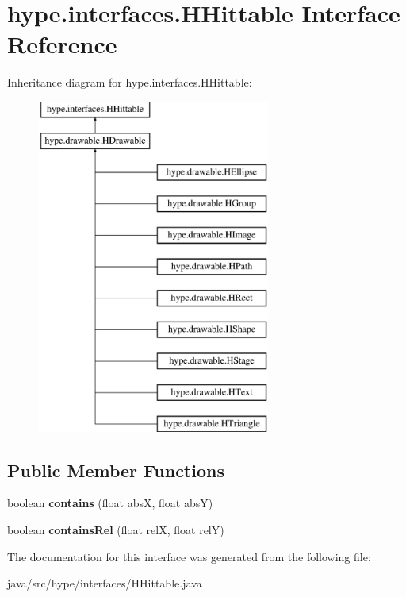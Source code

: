 \hypertarget{interfacehype_1_1interfaces_1_1_h_hittable}{\section{hype.\-interfaces.\-H\-Hittable Interface Reference}
\label{interfacehype_1_1interfaces_1_1_h_hittable}
}
Inheritance diagram for hype.\-interfaces.\-H\-Hittable\-:\begin{figure}[H]
\begin{center}
\leavevmode
\includegraphics[height=11.000000cm]{interfacehype_1_1interfaces_1_1_h_hittable}
\end{center}
\end{figure}
\subsection*{Public Member Functions}
\begin{DoxyCompactItemize}
\item 
\hypertarget{interfacehype_1_1interfaces_1_1_h_hittable_a59b90b964bb7e62e5e6b60c8aca009f1}{boolean {\bfseries contains} (float abs\-X, float abs\-Y)}\label{interfacehype_1_1interfaces_1_1_h_hittable_a59b90b964bb7e62e5e6b60c8aca009f1}

\item 
\hypertarget{interfacehype_1_1interfaces_1_1_h_hittable_a32d82db9b85427d49ef928c091fea464}{boolean {\bfseries contains\-Rel} (float rel\-X, float rel\-Y)}\label{interfacehype_1_1interfaces_1_1_h_hittable_a32d82db9b85427d49ef928c091fea464}

\end{DoxyCompactItemize}


The documentation for this interface was generated from the following file\-:\begin{DoxyCompactItemize}
\item 
java/src/hype/interfaces/H\-Hittable.\-java\end{DoxyCompactItemize}
